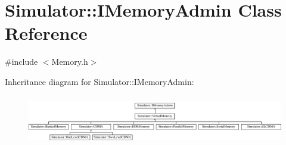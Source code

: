\hypertarget{class_simulator_1_1_i_memory_admin}{\section{Simulator\+:\+:I\+Memory\+Admin Class Reference}
\label{class_simulator_1_1_i_memory_admin}
}


{\ttfamily \#include $<$Memory.\+h$>$}

Inheritance diagram for Simulator\+:\+:I\+Memory\+Admin\+:\begin{figure}[H]
\begin{center}
\leavevmode
\includegraphics[height=2.183236cm]{class_simulator_1_1_i_memory_admin}
\end{center}
\end{figure}
